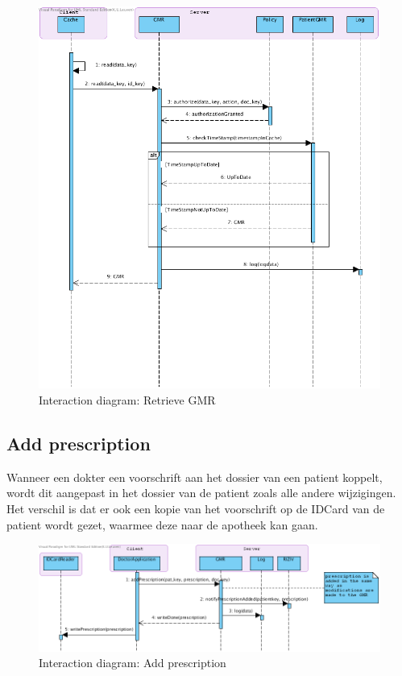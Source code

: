 \documentclass[a4paper,10pt]{article}
\begin{document}
\begin{figure}[!h]
  \includegraphics[width=\textwidth]{../images/retrieveGMR.png}
  \caption{Interaction diagram: Retrieve GMR}
\end{figure}

\subsection{Add prescription}
\label{interaction:addPrescription}
Wanneer een dokter een voorschrift aan het dossier van een patient koppelt, wordt dit aangepast in het dossier van de patient zoals alle andere wijzigingen.
Het verschil is dat er ook een kopie van het voorschrift op de IDCard van de patient wordt gezet, waarmee deze naar de apotheek kan gaan. 

\begin{figure}[!h]
  \includegraphics[width=\textwidth]{../images/addprescription.png}
  \caption{Interaction diagram: Add prescription}
\end{figure}
\end{document}
